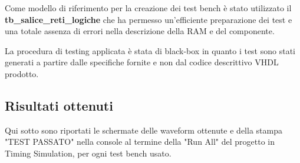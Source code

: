 \documentclass[a4paper,12pt]{article}
\begin{document}
Come modello di riferimento per la creazione dei test bench è stato utilizzato il \textbf{tb\_salice\_reti\_logiche} che ha permesso un'efficiente preparazione dei test e una totale assenza di errori nella descrizione della RAM e del componente. 

La procedura di testing applicata è stata di black-box in quanto i test sono stati generati a partire dalle specifiche fornite e non dal codice descrittivo VHDL prodotto.



\newpage
\subsection{Risultati ottenuti}
Qui sotto sono riportati le schermate delle waveform ottenute e della stampa "TEST PASSATO" nella console al termine della "Run All" del progetto in Timing Simulation, per ogni test bench usato.
\end{document}
